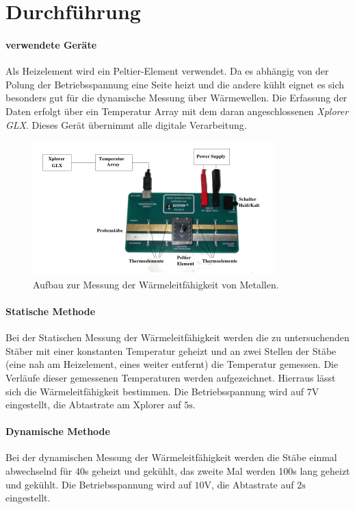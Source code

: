 \section{Durchführung}
\label{sec:Durchführung}
\paragraph{verwendete Geräte}
Als Heizelement wird ein Peltier-Element verwendet. Da es abhängig von der Polung der Betriebsspannung eine Seite heizt und die andere kühlt eignet es sich besonders gut für die dynamische Messung über Wärmewellen. Die Erfassung der Daten erfolgt über ein Temperatur Array mit dem daran angeschlossenen \textit{Xplorer GLX}. Dieses Gerät übernimmt alle digitale Verarbeitung.
\begin{figure}
  \includegraphics{./logos/Aufbau.PNG}
  \caption{Aufbau zur Messung der Wärmeleitfähigkeit von Metallen. \cite{Anleitung}}
  \label{fig:Aufbau}
\end{figure}
\paragraph{Statische Methode}
Bei der Statischen Messung der Wärmeleitfähigkeit werden die zu untersuchenden Stäber mit einer konstanten Temperatur geheizt und an zwei Stellen der Stäbe (eine nah am Heizelement, eines weiter entfernt) die Temperatur gemessen. Die Verläufe dieser gemessenen Temperaturen werden aufgezeichnet. Hierraus lässt sich die Wärmeleitfähigkeit bestimmen. Die Betriebsspannung wird auf $7\si{\volt}$ eingestellt, die Abtastrate am Xplorer auf $5\si{\second}$.
\paragraph{Dynamische Methode}
Bei der dynamischen Messung der Wärmeleitfähigkeit werden die Stäbe einmal abwechselnd für 40s geheizt und gekühlt, das zweite Mal werden 100s lang geheizt und gekühlt. Die Betriebsspannung wird auf $10\si{\volt}$, die Abtastrate auf $2 \si{\second}$ eingestellt.
